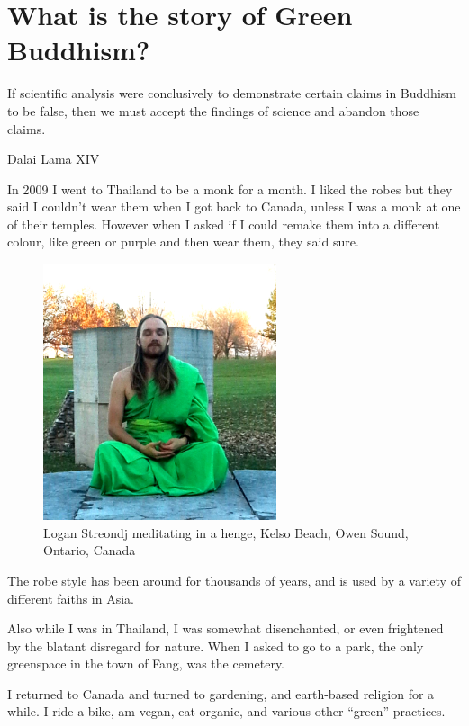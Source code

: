 
\chapter{What is the story of Green Buddhism?}
\epigraph{If scientific analysis were conclusively to demonstrate certain claims
in Buddhism to be false, then we must accept the findings of science and abandon
those claims.}
{Dalai Lama XIV\cite{singleAtom}}\label{whatstory}
In 2009 I went to Thailand to be a monk for a month. I liked the robes but they
said I couldn't wear them when I got back to Canada, unless I was a monk at one
of their temples. However when I asked if I could remake them into a different 
colour, like green or purple and then wear them, they said sure. 

\begin{figure}
  \centering
  \includegraphics[width=0.61\textwidth]{photograph/logan_streondj_meditating_20151109.png}
  \caption{Logan Streondj meditating in a henge, Kelso Beach, 
          Owen Sound, Ontario, Canada}\label{fig:meditating}
\end{figure}

The robe style has been around for thousands of years, and is used by a variety
of different faiths in Asia. 

Also while I was in Thailand, I was somewhat disenchanted, or even frightened by
the blatant disregard for nature. When I asked to go to a park, the only
greenspace in the town of Fang, was the cemetery. 

I returned to Canada and turned to gardening, and earth-based religion for a
while. I ride a bike, am vegan, eat organic, and various other ``green''
practices.

